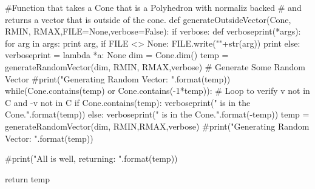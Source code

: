 \documentclass{TC}
\begin{document}
\begin{SAGE}
#Function that takes a Cone that is a Polyhedron with normaliz backed
# and returns a vector that is outside of the cone. 
def generateOutsideVector(Cone, RMIN, RMAX,FILE=None,verbose=False):
    if verbose:
        def verboseprint(*args):
            for arg in args:
                print arg,
                if FILE <> None:
                    FILE.write("\n"+str(arg))
            print
    else:
        verboseprint = lambda *a: None 
    dim = Cone.dim()
    temp = generateRandomVector(dim, RMIN, RMAX,verbose)                        # Generate Some Random Vector
    #print("Generating Random Vector: {}".format(temp))                        
    while(Cone.contains(temp) or Cone.contains(-1*temp)):               # Loop to verify v not in C and -v not in C
        if Cone.contains(temp):
            verboseprint("{} is in the Cone.".format(temp))
        else:
            verboseprint("{} is in the Cone.".format(-temp))
        temp = generateRandomVector(dim, RMIN,RMAX,verbose)
        #print("Generating Random Vector: {}".format(temp))     

    #print("All is well, returning: {}".format(temp))
    
    return temp
\end{SAGE}
\end{document}
